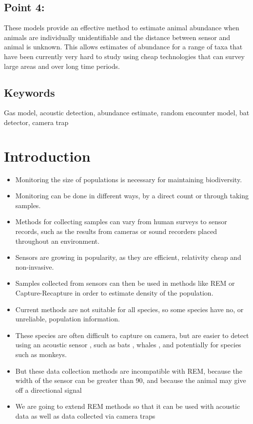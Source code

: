 \documentclass[a4paper,10pt,reqno,oneside]{amsart}
\begin{document}
\subsection*{Point 4:} These models provide an effective method to estimate animal abundance when animals are individually unidentifiable and the distance between sensor and animal is unknown. This allows estimates of abundance for a range of taxa that have been currently very hard to study using cheap technologies that can survey large areas and over long time periods. 


\subsection{Keywords}
Gas model, acoustic detection, abundance estimate, random encounter model, bat detector, camera trap

\section{Introduction}

\begin{itemize}
\item Monitoring the size of populations is necessary for maintaining biodiversity.
\item Monitoring can be done in different ways, by a direct count or through taking samples. \citep{pollock2002large}
\item Methods for collecting samples can vary from human surveys to sensor records, such as the results from cameras or sound recorders placed throughout an environment. 
\item Sensors are growing in popularity, as they are efficient, relativity cheap and non-invasive. \citep{gese2001monitoring}
\item Samples collected from sensors can then be used in methods like REM or Capture-Recapture in order to estimate density of the population.
\item Current methods are not suitable for all species, so some species have no, or unreliable, population information. 
\item These species are often difficult to capture on camera, but are easier to detect using an acoustic sensor \citep{rogers2013density}, such as bats \citep{ofarrel1999comparison}, whales \citep{mcdonald1999passive}, and potentially for species such as monkeys. 
\item But these data collection methods are incompatible with REM, because the width of the sensor can be greater than 90, and because the animal may give off a directional signal 
\item We are going to extend REM methods so that it can be used with acoustic data as well as data collected via camera traps
\end{itemize}
\end{document}
